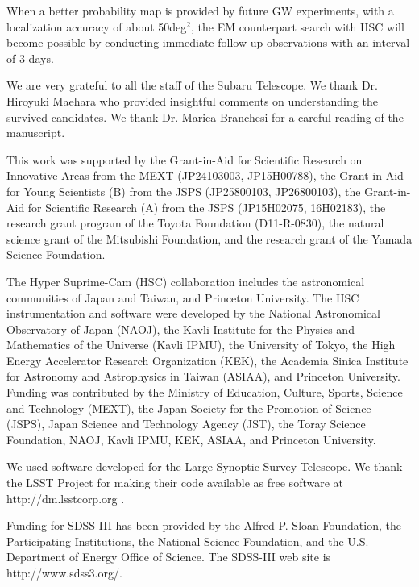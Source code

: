 \documentclass[]{pasj01}
\begin{document}
When a better probability map is provided by future GW experiments,  with a localization accuracy of about 50deg$^2$,
the EM counterpart search with HSC will become possible by conducting immediate follow-up observations with an interval of 3 days.

\begin{ack}
We are very grateful to all the staff of the Subaru Telescope.
We thank Dr. Hiroyuki Maehara who provided insightful comments on understanding the survived candidates.
We thank Dr. Marica Branchesi for a careful reading of the manuscript.

This work was supported by
the Grant-in-Aid for Scientific Research on Innovative Areas from the MEXT (JP24103003, JP15H00788),
the Grant-in-Aid for Young Scientists (B) from the JSPS (JP25800103, JP26800103),
the Grant-in-Aid for Scientific Research (A) from the JSPS (JP15H02075, 16H02183),
the research grant program of the Toyota Foundation (D11-R-0830),
the natural science grant of the Mitsubishi Foundation, and
the research grant of the Yamada Science Foundation.

The Hyper Suprime-Cam (HSC) collaboration includes the astronomical
communities of Japan and Taiwan, and Princeton University.  The HSC
instrumentation and software were developed by the National
Astronomical Observatory of Japan (NAOJ), the Kavli Institute for the
Physics and Mathematics of the Universe (Kavli IPMU), the University
of Tokyo, the High Energy Accelerator Research Organization (KEK), the
Academia Sinica Institute for Astronomy and Astrophysics in Taiwan
(ASIAA), and Princeton University.  Funding was contributed by the
Ministry of Education, Culture, Sports, Science and Technology (MEXT),
the Japan Society for the Promotion of Science (JSPS), 
Japan Science and Technology Agency (JST),  the Toray Science 
Foundation, NAOJ, Kavli IPMU, KEK, ASIAA,  and Princeton University.

We used software developed for the Large Synoptic Survey Telescope. We thank the LSST Project for making their code available as free software at http://dm.lsstcorp.org \citep{2008arXiv0805.2366I,2010SPIE.7740E..15A}.

Funding for SDSS-III has been provided by the Alfred P. Sloan Foundation, the Participating Institutions, the National Science Foundation, and the U.S. Department of Energy Office of Science. The SDSS-III web site is http://www.sdss3.org/.


\end{ack}
\end{document}

